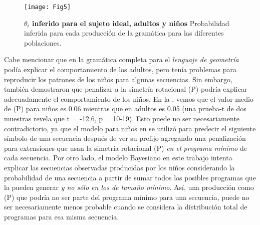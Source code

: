 \begin{figure}[!ht]
    \centering
    \texttt{[image: Fig5]}
    \caption{{\bf $\theta_i$ inferido para el sujeto ideal, adultos y niños} Probabilidad inferida para cada producción de la gramática para las diferentes poblaciones.}
    \label{fig:adultVsChildren}
\end{figure}


Cabe mencionar que en \cite{amalric2017language} la gramática completa para el \textit{lenguaje de geometría} podía explicar el comportamiento de los adultos, pero tenía problemas para reproducir los patrones de los niños para algunas secuencias. Sin embargo, también demostraron que penalizar a la simetría rotacional (P) podría explicar adecuadamente el comportamiento de los niños. En la , vemos que el valor medio de (P) para niños es 0.06 mientras que en adultos es 0.05 (una prueba-t de dos muestras revela que t = -12.6, p = 10-19). Esto puede no ser necesariamente contradictorio, ya que el modelo para niños en \cite{amalric2017language} se utilizó para predecir el siguiente símbolo de una secuencia después de ver su prefijo agregando una penalización para extensiones que usan la simetría rotacional (P) \textit{en el programa mínimo} de cada secuencia. Por otro lado, el modelo Bayesiano en este trabajo intenta explicar las secuencias observadas producidas por los niños considerando la probabilidad de una secuencia a partir de sumar todos los posibles programas que la pueden generar \textit{y no sólo en los de tamaño mínimo}. Así, una producción como (P) que podría no ser parte del programa mínimo para una secuencia, puede no ser necesariamente menos probable cuando se considera la distribución total de programas para esa misma secuencia.

